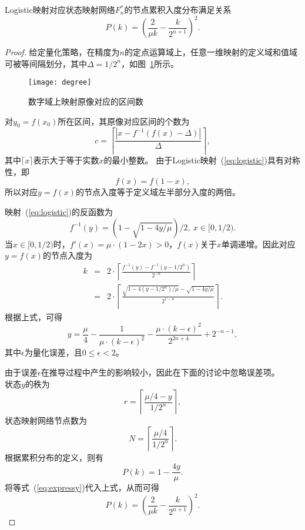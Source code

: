 \begin{theorem}
Logistic映射对应状态映射网络$F^*_n$的节点累积入度分布满足关系
\begin{equation*}
P(k)=\left(\frac{2}{\mu k}-\frac{k}{2^{n+1}}\right)^2.
\end{equation*}
\label{theorem:logisticMap}
\end{theorem}
\begin{proof}
给定量化策略，在精度为$n$的定点运算域上，任意一维映射的定义域和值域可被等间隔划分，其中$\Delta=1/2^n$，如图~\ref{fig:degree}所示。

\begin{figure}[!htb]
\centering
\texttt{[image: degree]}
\caption{数字域上映射原像对应的区间数}
\label{fig:degree}
\end{figure}

对$y_0=f(x_0)$所在区间，其原像对应区间的个数为
\begin{equation*}
c=\left\lceil \frac{ |x-f^{-1}(f(x)-\Delta)| }{\Delta} \right\rceil,
\end{equation*}
其中$\lceil x \rceil$表示大于等于实数$x$的最小整数。
由于Logistic映射~(\ref{eq:logistic})具有对称性，即
\begin{equation}
f(x)=f(1-x),
\label{eq:logisticsym}
\end{equation}
所以对应$y=f(x)$的节点入度等于定义域左半部分入度的两倍。

映射~(\ref{eq:logistic})的反函数为
\begin{equation*}
f^{-1}(y)=\left(1-\sqrt{1-4y/\mu}\right)/2,\ x\in [0, 1/2).
\end{equation*}
当$x\in [0, 1/2)$时，$f'(x)=\mu \cdot (1-2x)>0$，$f(x)$关于$x$单调递增。因此对应$y=f(x)$的节点入度为
\begin{eqnarray*}
k & = &  2 \cdot \left\lceil \frac{ f^{-1}(y)-f^{-1}(y-1/2^n)}{2^{-n}} \right\rceil \\
  & = &  2 \cdot \left\lceil \frac{\sqrt{1-4(y-1/2^n)/ \mu} -\sqrt{1-4y/ \mu} }{2^{1-n}} \right\rceil.
\end{eqnarray*}
根据上式，可得
\begin{equation}
y=\frac{\mu}{4} -\frac{1}{\mu\cdot  (k-\epsilon)^2 }
-\frac{\mu\cdot (k-\epsilon)^2}{2^{2n+4}} + 2^{-n-1},
\label{eq:expressy}
\end{equation}
其中$\epsilon$为量化误差，且$0\le \epsilon<2$。

由于误差$\epsilon$在推导过程中产生的影响较小，因此在下面的讨论中忽略误差项。\\
状态$y$的秩为
\begin{equation*}
r=\left\lceil \frac{\mu/4-y}{1/2^{n}} \right\rceil,
\end{equation*}
状态映射网络节点数为
\begin{equation*}
N=\left\lceil \frac{\mu/4}{1/2^{n}}\right\rceil.
\end{equation*}
根据累积分布的定义，则有
\begin{equation*}
P(k)=1-\frac{4y}{\mu}.
\end{equation*}
将等式~(\ref{eq:expressy})代入上式，从而可得
\begin{equation*}
P(k)=\left( \frac{2}{\mu k}- \frac{k}{2^{n+1}} \right)^2.
\end{equation*}


\end{proof}
